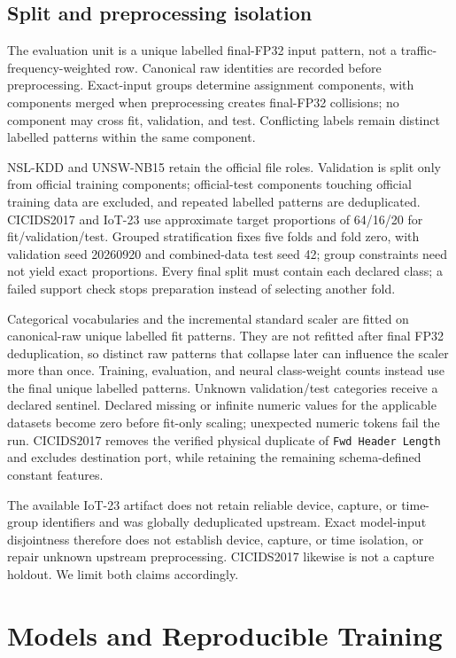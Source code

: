 \documentclass[10pt,conference]{IEEEtran}
\begin{document}
\subsection{Split and preprocessing isolation}

The evaluation unit is a unique labelled final-FP32 input pattern, not a
traffic-frequency-weighted row. Canonical raw identities are recorded before
preprocessing. Exact-input groups determine assignment components, with
components merged when preprocessing creates final-FP32 collisions; no
component may cross fit, validation, and test. Conflicting labels remain
distinct labelled patterns within the same component.

NSL-KDD and UNSW-NB15 retain the official file roles. Validation is split only
from official training components; official-test components touching official
training data are excluded, and repeated labelled patterns are deduplicated.
CICIDS2017 and IoT-23 use approximate target proportions of 64/16/20 for
fit/validation/test. Grouped stratification fixes five folds and fold zero,
with validation seed 20260920 and combined-data test seed 42; group constraints
need not yield exact proportions. Every final split must contain each declared
class; a failed support check stops preparation instead of selecting another
fold.

Categorical vocabularies and the incremental standard scaler are fitted on
canonical-raw unique labelled fit patterns. They are not refitted after final
FP32 deduplication, so distinct raw patterns that collapse later can influence
the scaler more than once. Training, evaluation, and neural class-weight
counts instead use the final unique labelled patterns. Unknown validation/test
categories receive a declared sentinel. Declared missing or infinite numeric
values for the applicable datasets become zero before fit-only scaling;
unexpected numeric tokens fail the run. CICIDS2017 removes the verified
physical duplicate of \texttt{Fwd Header Length} and excludes destination port,
while retaining the remaining schema-defined constant features.

The available IoT-23 artifact does not retain reliable device, capture, or
time-group identifiers and was globally deduplicated upstream. Exact model-input
disjointness therefore does not establish device, capture, or time isolation,
or repair unknown upstream preprocessing. CICIDS2017 likewise is not a capture
holdout. We limit both claims accordingly.

\section{Models and Reproducible Training}
\end{document}
